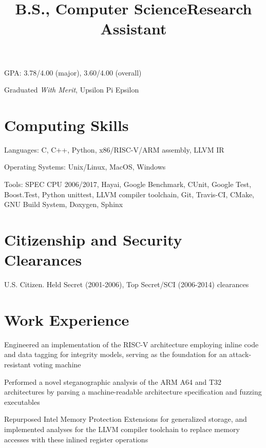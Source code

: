 \documentclass[line]{res}
\begin{document}
\begin{resume}
\title{B.S., Computer Science}
\begin{position}
\vspace*{-.2cm}
\begin{list2}
	\item GPA: 3.78/4.00 (major), 3.60/4.00 (overall)
	\item Graduated {\it With Merit}, Upsilon Pi Epsilon
\end{list2}
\end{position}

\section{Computing Skills}
\begin{list2}
\item Languages: C, C++, Python, x86/RISC-V/ARM assembly, LLVM IR
\item Operating Systems: Unix/Linux, MacOS, Windows
\item Tools: SPEC CPU 2006/2017, Hayai, Google Benchmark, CUnit, Google Test, Boost.Test, Python unittest, LLVM compiler toolchain, Git, Travis-CI, CMake, GNU Build System, Doxygen, Sphinx
\end{list2}

\section{Citizenship and Security Clearances}
U.S. Citizen. Held {\sc Secret} (2001-2006), {\sc Top Secret/SCI} (2006-2014) clearances

\section{Work Experience}

\title{{\bf Research Assistant}}
\begin{position}
\vspace*{-.2cm}
\begin{list2}
	\item Engineered an implementation of the RISC-V architecture employing inline code and data tagging for integrity models, serving as the foundation for an attack-resistant voting machine
	\item Performed a novel steganographic analysis of the ARM A64 and T32 architectures by parsing a machine-readable architecture specification and fuzzing executables
	\item Repurposed Intel Memory Protection Extensions for generalized storage, and implemented analyses for the LLVM compiler toolchain to replace memory accesses with these inlined register operations
\end{list2}
\end{position}


\end{resume}
\end{document}
